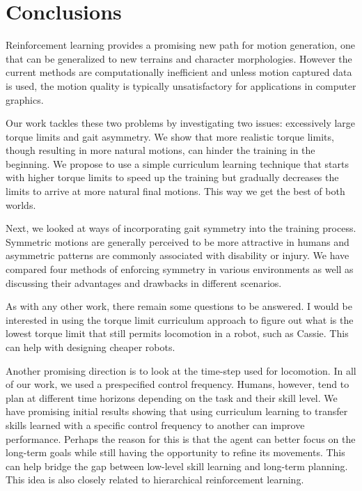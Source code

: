 \chapter{Conclusions}
\label{ch:conclusions}

Reinforcement learning provides a promising new path for motion generation, one that can be generalized to new terrains and character morphologies. However the current methods are computationally inefficient and unless motion captured data is used, the motion quality is typically unsatisfactory for applications in computer graphics.

Our work  tackles these two problems by investigating two issues: excessively large torque limits and gait asymmetry. We show that more realistic torque limits, though resulting in more natural motions, can hinder the training in the beginning. We propose to use a simple curriculum learning technique that starts with higher torque limits to speed up the training but gradually decreases the limits to arrive at more natural final motions. This way we get the best of both worlds.

Next, we looked at ways of incorporating gait symmetry into the training process. Symmetric motions are generally perceived to be more attractive in humans and asymmetric patterns are commonly associated with disability or injury. We have compared four methods of enforcing symmetry in various environments as well as discussing their advantages and drawbacks in different scenarios.

As with any other work, there remain some questions to be answered.
I would be interested in using the torque limit curriculum approach to figure out what is the lowest torque limit that still permits locomotion in a robot, such as Cassie. This can help with designing cheaper robots.

Another promising direction is to look at the time-step used for locomotion. In all of our work, we used a prespecified control frequency. Humans, however, tend to plan at different time horizons depending on the task and their skill level. We have promising initial results showing that using curriculum learning to transfer skills learned with a specific control frequency to another can improve performance. Perhaps the reason for this is that the agent can better focus on the long-term goals while still having the opportunity to refine its movements. This can help bridge the gap between low-level skill learning and long-term planning. This idea is also closely related to hierarchical reinforcement learning.